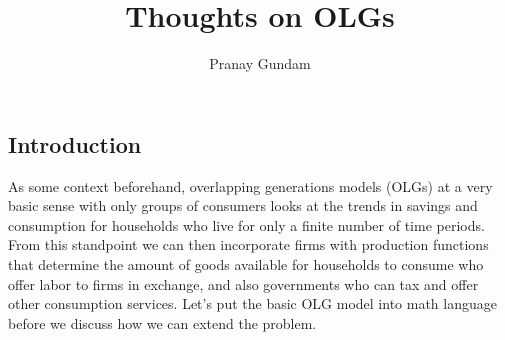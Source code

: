 \documentclass[11pt,english]{article}
\title{\textbf{Thoughts on OLGs}}
\author{Pranay Gundam}
\begin{document}
\maketitle

\subsection*{Introduction}

\noindent As some context beforehand, overlapping generations models (OLGs) at a very basic sense with only groups of consumers looks at the trends in savings and consumption for households who live for only a finite number of time periods. From this standpoint we can then incorporate firms with production functions that determine the amount of goods available for households to consume who offer labor to firms in exchange, and also governments who can tax and offer other consumption services. Let's put the basic OLG model into math language before we discuss how we can extend the problem.\\
\end{document}
